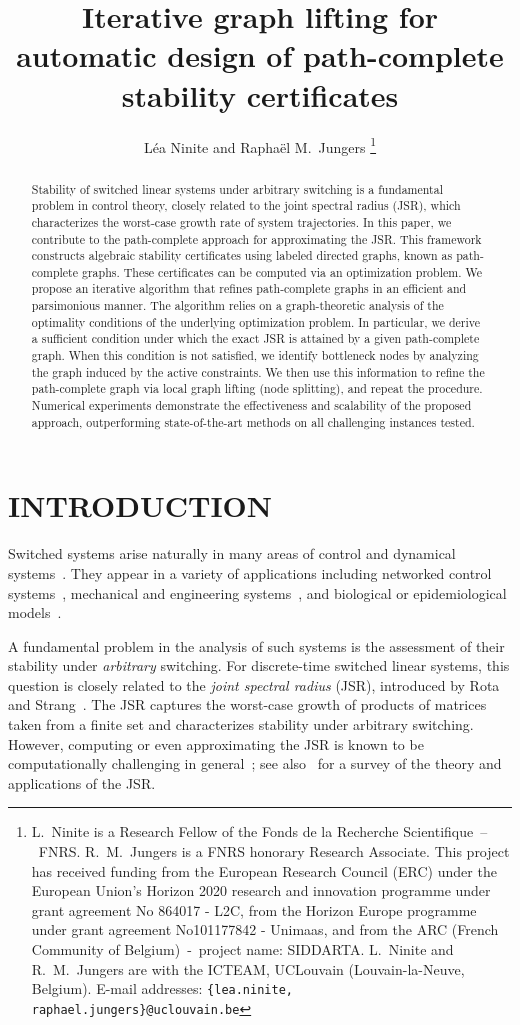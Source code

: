 \documentclass[letterpaper, 10 pt, conference]{ieeeconf}  %
\title{\LARGE \bf
Iterative graph lifting for automatic design of path-complete stability certificates
}
\author{Léa Ninite and Raphaël M.~Jungers%
\thanks{L.~Ninite is a Research Fellow of the Fonds de la Recherche Scientifique~–~FNRS. R.~M.~Jungers is a FNRS honorary Research Associate. This project has
received funding from the European Research Council (ERC) under the
European Union’s Horizon 2020 research and innovation programme under
grant agreement No 864017 - L2C, from the Horizon Europe programme
under grant agreement No101177842 - Unimaas, and from the ARC (French
Community of Belgium)~-~project name: SIDDARTA. L.~Ninite and R.~M.~Jungers are with the
ICTEAM, UCLouvain (Louvain-la-Neuve, Belgium). E-mail addresses: {\tt\small \{lea.ninite, raphael.jungers\}@uclouvain.be}}%
}
\begin{document}
\maketitle
\thispagestyle{empty}
\pagestyle{empty}


\begin{abstract}
Stability of switched linear systems under arbitrary switching is a fundamental problem in control theory, closely related to the joint spectral radius (JSR), which characterizes the worst-case growth rate of system trajectories.
In this paper, we contribute to the path-complete approach for approximating the JSR. This framework constructs algebraic stability certificates using labeled directed graphs, known as path-complete graphs. These certificates can be computed via an optimization problem. We propose an iterative algorithm that refines path-complete graphs in an efficient and parsimonious manner. The algorithm relies on a graph-theoretic analysis of the optimality conditions of the underlying optimization problem. In particular, we derive a sufficient condition under which the exact JSR is attained by a given path-complete graph. When this condition is not satisfied, we identify bottleneck nodes by analyzing the graph induced by the active constraints. We then use this information to refine the path-complete graph via local graph lifting (node splitting), and repeat the procedure. Numerical experiments demonstrate the effectiveness and scalability of the proposed approach, outperforming state-of-the-art methods on all challenging instances tested.
\end{abstract}


\section{INTRODUCTION}
Switched systems arise naturally in many areas of control and dynamical
systems~\cite{liberzon2003switching,jungers2009joint}. They appear in a
variety of applications including networked control systems~\cite{donkers2011stability}, mechanical and engineering systems~\cite{blanchini2012constant}, and biological or epidemiological models~\cite{hernandez2011optimal}.

A fundamental problem in the analysis of such systems is the assessment
of their stability under \emph{arbitrary} switching. For discrete-time switched
linear systems, this question is closely related to the
\emph{joint spectral radius} (JSR), introduced by Rota and Strang~\cite{rota1960jsr}. The JSR captures the worst-case growth of products
of matrices taken from a finite set and characterizes stability under arbitrary switching. However, computing or even
approximating the JSR is known to be computationally challenging in
general~\cite{blondel2000boundedness,tsitsiklis1997lyapunov}; see also~\cite{jungers2009joint} for a survey of the theory and applications of
the JSR.
\end{document}
